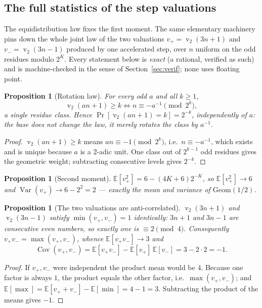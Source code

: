 \documentclass[11pt,a4paper]{article}
\theoremstyle{plain}
\newtheorem{proposition}[theorem]{Proposition}
\theoremstyle{definition}
\newcommand{\val}{\operatorname{v}_2}
\begin{document}
\subsection{The full statistics of the step valuations}\label{sub:stats}

The equidistribution law fixes the first moment. The same elementary machinery pins down the
whole joint law of the two valuations $v_{+}=\val(3n+1)$ and $v_{-}=\val(3n-1)$ produced by
one accelerated step, over $n$ uniform on the odd residues modulo $2^{K}$. Every statement
below is \emph{exact} (a rational, verified as such) and is machine-checked in the sense of
Section~\ref{sec:verif}; none uses floating point.

\begin{proposition}[Rotation law]\label{prop:rot}
For every odd $a$ and all $k\ge1$,
\[
  \val(an+1)\ge k \iff n\equiv -a^{-1}\pmod{2^{k}},
\]
a single residue class. Hence $\Pr[\val(an+1)=k]=2^{-k}$, independently of $a$: the base does
not change the law, it merely \emph{rotates} the class by $a^{-1}$.
\end{proposition}
\begin{proof}
$\val(an+1)\ge k$ means $an\equiv-1\pmod{2^{k}}$, i.e.\ $n\equiv-a^{-1}$, which exists and is
unique because $a$ is a $2$-adic unit. One class out of $2^{k-1}$ odd residues gives the
geometric weight; subtracting consecutive levels gives $2^{-k}$.
\end{proof}

\begin{proposition}[Second moment]\label{prop:var}
$\mathbb{E}[v_{+}^{2}]=6-(4K+6)2^{-K}$, so $\mathbb{E}[v_{+}^{2}]\to6$ and
$\operatorname{Var}(v_{+})\to 6-2^{2}=2$ --- exactly the mean and variance of $\mathrm{Geom}(1/2)$.
\end{proposition}

\begin{proposition}[The two valuations are anti-correlated]\label{prop:cov}
$\val(3n+1)$ and $\val(3n-1)$ satisfy $\min(v_{+},v_{-})=1$ identically: $3n+1$ and $3n-1$ are
consecutive even numbers, so exactly one is $\equiv2\pmod4$. Consequently
$v_{+}v_{-}=\max(v_{+},v_{-})$, whence $\mathbb{E}[v_{+}v_{-}]\to3$ and
\[
  \operatorname{Cov}(v_{+},v_{-})=\mathbb{E}[v_{+}v_{-}]-\mathbb{E}[v_{+}]\,\mathbb{E}[v_{-}]
  = 3-2\cdot2 = -1 .
\]
\end{proposition}
\begin{proof}
If $v_{+},v_{-}$ were independent the product mean would be $4$. Because one factor is always
$1$, the product equals the other factor, i.e.\ $\max(v_{+},v_{-})$; and
$\mathbb{E}[\max]=\mathbb{E}[v_{+}+v_{-}]-\mathbb{E}[\min]=4-1=3$. Subtracting the product of
the means gives $-1$.
\end{proof}
\end{document}
